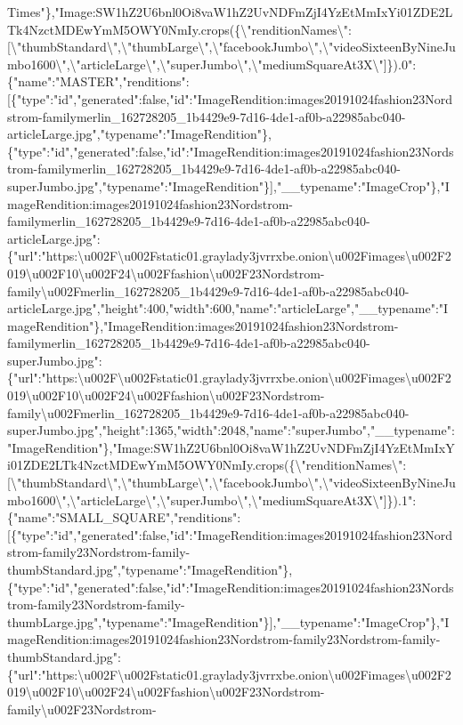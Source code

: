 Times"\},"Image:SW1hZ2U6bnl0Oi8vaW1hZ2UvNDFmZjI4YzEtMmIxYi01ZDE2LTk4NzctMDEwYmM5OWY0NmIy.crops(\{\textbackslash{}"renditionNames\textbackslash{}":{[}\textbackslash{}"thumbStandard\textbackslash{}",\textbackslash{}"thumbLarge\textbackslash{}",\textbackslash{}"facebookJumbo\textbackslash{}",\textbackslash{}"videoSixteenByNineJumbo1600\textbackslash{}",\textbackslash{}"articleLarge\textbackslash{}",\textbackslash{}"superJumbo\textbackslash{}",\textbackslash{}"mediumSquareAt3X\textbackslash{}"{]}\}).0":\{"name":"MASTER","renditions":{[}\{"type":"id","generated":false,"id":"ImageRendition:images20191024fashion23Nordstrom-familymerlin\_162728205\_1b4429e9-7d16-4de1-af0b-a22985abc040-articleLarge.jpg","typename":"ImageRendition"\},\{"type":"id","generated":false,"id":"ImageRendition:images20191024fashion23Nordstrom-familymerlin\_162728205\_1b4429e9-7d16-4de1-af0b-a22985abc040-superJumbo.jpg","typename":"ImageRendition"\}{]},"\_\_typename":"ImageCrop"\},"ImageRendition:images20191024fashion23Nordstrom-familymerlin\_162728205\_1b4429e9-7d16-4de1-af0b-a22985abc040-articleLarge.jpg":\{"url":"https:\textbackslash{}u002F\textbackslash{}u002Fstatic01.graylady3jvrrxbe.onion\textbackslash{}u002Fimages\textbackslash{}u002F2019\textbackslash{}u002F10\textbackslash{}u002F24\textbackslash{}u002Ffashion\textbackslash{}u002F23Nordstrom-family\textbackslash{}u002Fmerlin\_162728205\_1b4429e9-7d16-4de1-af0b-a22985abc040-articleLarge.jpg","height":400,"width":600,"name":"articleLarge","\_\_typename":"ImageRendition"\},"ImageRendition:images20191024fashion23Nordstrom-familymerlin\_162728205\_1b4429e9-7d16-4de1-af0b-a22985abc040-superJumbo.jpg":\{"url":"https:\textbackslash{}u002F\textbackslash{}u002Fstatic01.graylady3jvrrxbe.onion\textbackslash{}u002Fimages\textbackslash{}u002F2019\textbackslash{}u002F10\textbackslash{}u002F24\textbackslash{}u002Ffashion\textbackslash{}u002F23Nordstrom-family\textbackslash{}u002Fmerlin\_162728205\_1b4429e9-7d16-4de1-af0b-a22985abc040-superJumbo.jpg","height":1365,"width":2048,"name":"superJumbo","\_\_typename":"ImageRendition"\},"Image:SW1hZ2U6bnl0Oi8vaW1hZ2UvNDFmZjI4YzEtMmIxYi01ZDE2LTk4NzctMDEwYmM5OWY0NmIy.crops(\{\textbackslash{}"renditionNames\textbackslash{}":{[}\textbackslash{}"thumbStandard\textbackslash{}",\textbackslash{}"thumbLarge\textbackslash{}",\textbackslash{}"facebookJumbo\textbackslash{}",\textbackslash{}"videoSixteenByNineJumbo1600\textbackslash{}",\textbackslash{}"articleLarge\textbackslash{}",\textbackslash{}"superJumbo\textbackslash{}",\textbackslash{}"mediumSquareAt3X\textbackslash{}"{]}\}).1":\{"name":"SMALL\_SQUARE","renditions":{[}\{"type":"id","generated":false,"id":"ImageRendition:images20191024fashion23Nordstrom-family23Nordstrom-family-thumbStandard.jpg","typename":"ImageRendition"\},\{"type":"id","generated":false,"id":"ImageRendition:images20191024fashion23Nordstrom-family23Nordstrom-family-thumbLarge.jpg","typename":"ImageRendition"\}{]},"\_\_typename":"ImageCrop"\},"ImageRendition:images20191024fashion23Nordstrom-family23Nordstrom-family-thumbStandard.jpg":\{"url":"https:\textbackslash{}u002F\textbackslash{}u002Fstatic01.graylady3jvrrxbe.onion\textbackslash{}u002Fimages\textbackslash{}u002F2019\textbackslash{}u002F10\textbackslash{}u002F24\textbackslash{}u002Ffashion\textbackslash{}u002F23Nordstrom-family\textbackslash{}u002F23Nordstrom-